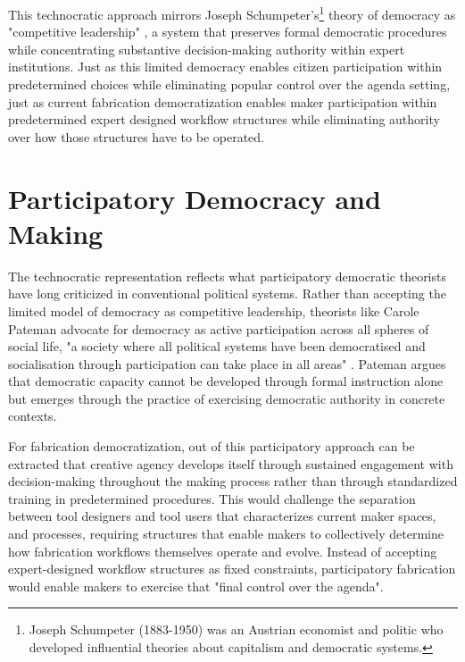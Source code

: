 This technocratic approach mirrors Joseph Schumpeter's\footnote{Joseph Schumpeter (1883-1950) was an Austrian economist and politic who developed influential theories about capitalism and democratic systems.} theory of democracy as "competitive leadership" \citep{schumpeter1950}, a system that preserves formal democratic procedures while concentrating substantive decision-making authority within expert institutions. Just as this limited democracy enables citizen participation within predetermined choices while eliminating popular control over the agenda setting, just as current fabrication democratization enables maker participation within predetermined expert designed workflow structures while eliminating authority over how those structures have to be operated.

\section{Participatory Democracy and Making}

The technocratic representation reflects what participatory democratic theorists have long criticized in conventional political systems. Rather than accepting the limited model of democracy as competitive leadership, theorists like Carole Pateman advocate for democracy as active participation across all spheres of social life, "a society where all political systems have been democratised and socialisation through participation can take place in all areas" \citep{pateman1976}. Pateman argues that democratic capacity cannot be developed through formal instruction alone but emerges through the practice of exercising democratic authority in concrete contexts.

\vspace{0.5cm}

For fabrication democratization, out of this participatory approach can be extracted that creative agency develops itself through sustained engagement with decision-making throughout the making process rather than through standardized training in predetermined procedures. This would challenge the separation between tool designers and tool users that characterizes current maker spaces, and processes, requiring structures that enable makers to collectively determine how fabrication workflows themselves operate and evolve. Instead of accepting expert-designed workflow structures as fixed constraints, participatory fabrication would enable makers to exercise that "final control over the agenda".





